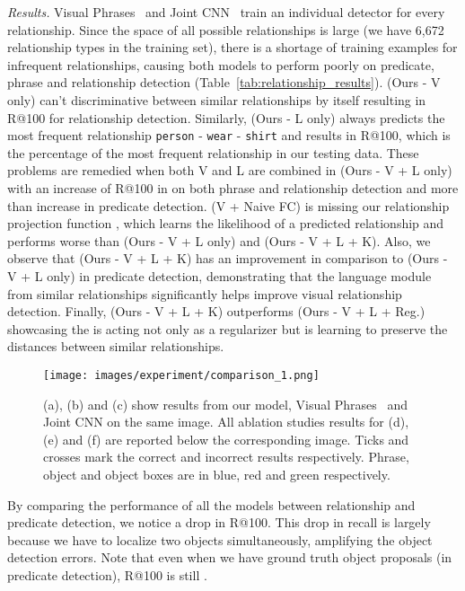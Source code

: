 \documentclass[runningheads]{llncs}
\newcommand{\relationship}[3]{\texttt{#1} - \texttt{#2} - \texttt{#3}}
\begin{document}
\textit{Results.} Visual Phrases~\cite{sadeghi2011recognition} and Joint CNN~\cite{simonyan2014very} train an individual detector for every relationship. Since the space of all possible relationships is large (we have 6,672 relationship types in the training set), there is a shortage of training examples for infrequent relationships, causing both models to perform poorly on predicate, phrase and relationship detection (Table~\ref{tab:relationship_results}). (Ours - V only) can't discriminative between similar relationships by itself resulting in  R@100 for relationship detection. Similarly, (Ours - L only) always predicts the most frequent relationship \relationship{person}{wear}{shirt} and results in  R@100, which is the percentage of the most frequent relationship in our testing data. These problems are remedied when both V and L are combined in (Ours - V + L only) with an increase of  R@100 in on both phrase and relationship detection and more than  increase in predicate detection. (V + Naive FC) is missing our relationship projection function , which learns the likelihood of a predicted relationship and performs worse than (Ours - V + L only) and (Ours - V + L + K). Also, we observe that (Ours - V + L + K) has an  improvement in comparison to (Ours - V + L only) in predicate detection, demonstrating that the language module from similar relationships significantly helps improve visual relationship detection. Finally, (Ours - V + L + K) outperforms (Ours - V + L + Reg.) showcasing the  is acting not only as a regularizer but is learning to preserve the distances between similar relationships.


\begin{figure}[t]
\centering
\setlength{\belowcaptionskip}{-20pt}
\texttt{[image: images/experiment/comparison\_1.png]}
\vspace{-0.1in}
\caption{(a), (b) and (c) show results from our model, Visual Phrases~\cite{sadeghi2011recognition} and Joint CNN \cite{simonyan2014very} on the same image. All ablation studies results for (d), (e) and (f) are reported below the corresponding image. Ticks and crosses mark the correct and incorrect results respectively. Phrase, object and object boxes are in blue, red and green respectively.}
\label{fig:relationship_results}
\end{figure}

By comparing the performance of all the models between relationship and predicate detection, we notice a  drop in R@100. This drop in recall is largely because we have to localize two objects simultaneously, amplifying the object detection errors. Note that even when we have ground truth object proposals (in predicate detection), R@100 is still . 
\end{document}
